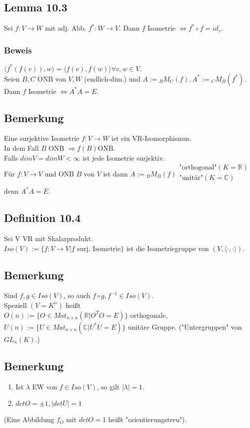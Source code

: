 \documentclass[a4paper, 12pt]{extarticle}
\newcommand{\skalar}[2] {
	\langle #1, #2\rangle
}
\begin{document}
\subsection*{Lemma 10.3}
Sei $f: V \longrightarrow W$ mit adj. Abb. $f^* : W \longrightarrow V$. Dann $f$ Isometrie $\Leftrightarrow f^* \circ f = id_v$.
\subsubsection*{Beweis}
$\skalar{f^*(f(v))}{w} = \skalar{f(v)}{f(w)} \forall v,w \in V.$\\
Seien $B, C$ ONB von $V, W$ (endlich-dim.) und $A:= {}_BM_C(f), A^* := {}_CM_B(f^*).$
Dann $f$ Isometrie $\Leftrightarrow A^*A = E$.
\subsection*{Bemerkung}
Eine surjektive Isometrie $f: V \longrightarrow W$ ist ein VR-Isomorphismus.\\
In dem Fall $B$ ONB $\Rightarrow f(B)$ONB.\\
Falls $dimV = dimW < \infty$ ist jede Isometrie surjektiv.\\
Für $f: V\longrightarrow V$ und ONB $B$ von $V$ ist dann $A := {}_BM_B(f) \begin{matrix}
	\text{"orthogonal"} (K = \mathbb{R})\\
	\text{"unitär"} (K = \mathbb{C})\\
\end{matrix}$ denn $A^*A = E$.
\subsection*{Definition 10.4}
Sei V VR mit Skalarprodukt.\\
$Iso(V) := \{f:V\longrightarrow V | f \text{ surj. Isometrie}\}$ ist die Isometriegruppe von $(V, \skalar{\cdot}{\cdot})$.\\
\subsection*{Bemerkung}
Sind $f,g \in Iso(V)$, so auch $f\circ g, f^{-1} \in Iso(V)$.\\
Speziell $(V = K^n)$ heißt\\
$O(n) := \{O \in Mat_{n\times n}(\mathbb{R} | O^TO = E)\}$ orthogonale, \\
$U(n) := \{U \in Mat_{n\times n}(\mathbb{C} | U^*U = E)\}$ unitäre Gruppe. ("Untergruppen" von $GL_n(K)$.)
\subsection*{Bemerkung}
\begin{enumerate}[label = \alph*)]
	\item Ist $\lambda$ EW von $f \in Iso(V)$, so gilt $|\lambda| = 1$.
	\item $detO = \pm 1 , |detU| = 1$ 
\end{enumerate}
(Eine Abbildung $f_O$ mit $detO = 1$ heißt "orientierungstreu").
\end{document}
